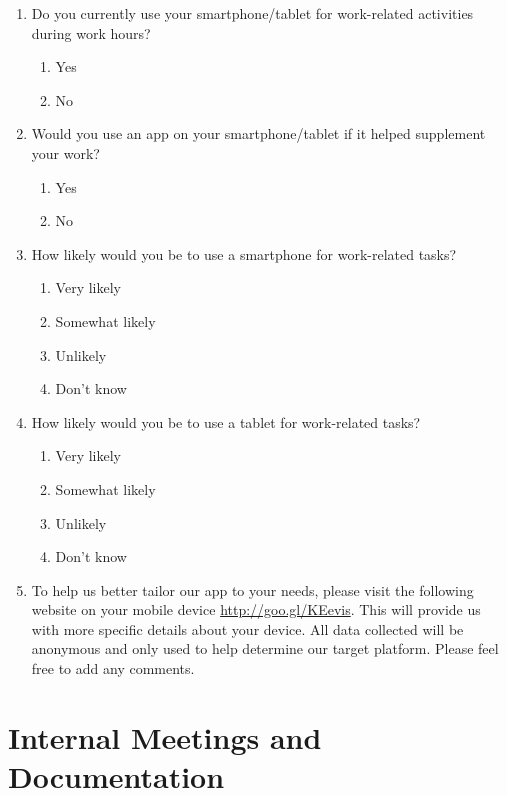 \documentclass[12pt,a4paper,oneside,titlepage]{article}
\begin{document}
\begin{enumerate}
\item Do you currently use your smartphone/tablet for work-related activities during work hours?
\begin{enumerate}
\item Yes
\item No
\end{enumerate}
\item Would you use an app on your smartphone/tablet if it helped supplement your work?
\begin{enumerate}
\item Yes
\item No
\end{enumerate}
\item How likely would you be to use a smartphone for work-related tasks?
\begin{enumerate}
\item Very likely
\item Somewhat likely
\item Unlikely
\item Don't know
\end{enumerate}
\item How likely would you be to use a tablet for work-related tasks?
\begin{enumerate}
\item Very likely
\item Somewhat likely
\item Unlikely
\item Don't know
\end{enumerate}
\item To help us better tailor our app to your needs, please visit the following website on your mobile device \url{http://goo.gl/KEevis}. This will provide us with more specific details about your device. All data collected will be anonymous and only used to help determine our target platform. Please feel free to add any comments.\\
\framebox[8cm]{}
\end{enumerate}  

\newpage
\section{Internal Meetings and Documentation}
\label{sec:internal_meetings}
\end{document}
